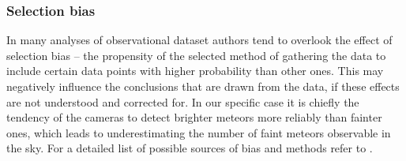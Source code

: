         \subsubsection{Selection bias} \label{msab}
            In many analyses of observational dataset authors tend to overlook the effect of selection bias --  the
            propensity of the selected method of gathering the data to include certain data points with higher probability than other ones.
            This may negatively influence the conclusions that are drawn from the data, if these effects are not understood and corrected for.
            In our specific case it is chiefly the tendency of the cameras to detect brighter meteors more reliably than fainter ones,
            which leads to underestimating the number of faint meteors observable in the sky.
            For a detailed list of possible sources of bias and methods refer to \citet{balaz-thesis}.



